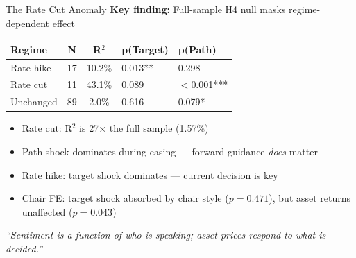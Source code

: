 \documentclass[aspectratio=169, 11pt]{beamer}
\begin{document}
\begin{frame}{The Rate Cut Anomaly}
  \textbf{Key finding:} Full-sample H4 null masks regime-dependent effect

  \vspace{0.3em}
  \centering
  \begin{tabular}{lccll}
    \toprule
    Regime & N & R$^2$ & p(Target) & p(Path) \\
    \midrule
    Rate hike  & 17 & 10.2\% & 0.013** & 0.298 \\
    Rate cut   & 11 & 43.1\% & 0.089   & $<$0.001*** \\
    Unchanged  & 89 & 2.0\%  & 0.616   & 0.079* \\
    \bottomrule
  \end{tabular}

  \vspace{0.5em}
  \begin{itemize}
    \item Rate cut: R$^2$ is 27$\times$ the full sample (1.57\%)
    \item Path shock dominates during easing --- forward guidance \emph{does} matter
    \item Rate hike: target shock dominates --- current decision is key
    \item Chair FE: target shock absorbed by chair style ($p=0.471$), but asset returns unaffected ($p=0.043$)
  \end{itemize}

  \vspace{0.3em}
  \small\textit{``Sentiment is a function of who is speaking; asset prices respond to what is decided.''}
\end{frame}
\end{document}
